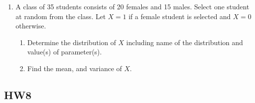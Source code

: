 \documentclass[12pt]{article}
\begin{document}
\begin{enumerate}
\newpage

  \item A class of 35 students consists of 20 females and 15 males. Select one student at random from the class. Let $X = 1$ if a female student is selected and $X = 0$ otherwise.
    \begin{enumerate}[label=(\alph*)]
      \item Determine the distribution of $X$ including name of the distribution and value(s) of parameter(s).
      \item Find the mean, and variance of $X$.
    \end{enumerate}

\newpage

\end{enumerate}

\subsection*{HW8}
\end{document}
